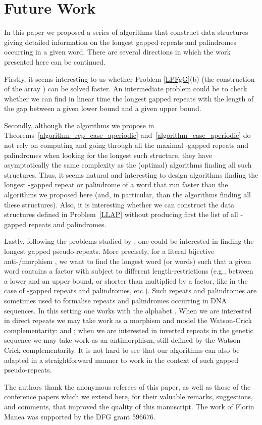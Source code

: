 \documentclass[final]{dmtcs-episciences}
\begin{document}
\section{Future Work}

In this paper we proposed a series of algorithms that construct data structures giving detailed information on the longest gapped repeats  and palindromes occurring in a given word. There are several directions in which the work presented here can be continued.

Firstly, it seems interesting to us whether Problem \ref{LPFgG}(b) (the construction of the array ) can be solved faster. An intermediate problem could be to check whether we can find in linear time the longest gapped repeats with the length of the gap between a given lower bound and a given upper bound. 

Secondly, although the algorithms we propose in Theorems~\ref{algorithm_rep_case_aperiodic} and~\ref{algorithm_case_aperiodic} do not rely on computing and going through all the maximal -gapped repeats and palindromes when looking for the longest such structure, they have asymptotically the same complexity as the (optimal) algorithms finding all such structures. Thus, it seems natural and interesting to design algorithms finding the longest -gapped repeat or palindrome of a word that run faster than the algorithms we proposed here (and, in particular, than the algorithms finding all these structures). Also, it is interesting whether we can construct the data structures defined in Problem~\ref{LLAP} without producing first the list of all -gapped repeats and palindromes. 

Lastly, following the problems studied by \cite{GMMNT13,GMN14}, one could be interested in finding the longest gapped pseudo-repeats. More precisely, for a literal bijective anti-/morphism , we want to find the longest word (or words)  such that a given word  contains a factor  with  subject to different length-restrictions (e.g., between a lower and an upper bound, or shorter than  multiplied by a factor, like in the case of -gapped repeats and palindromes, etc.). Such repeats and palindromes are sometimes used to formalise repeats and palindromes occurring in DNA sequences. In this setting one works with the alphabet . When we are interested in direct repeats we may take  work as a morphism and model the Watson-Crick complementarity:  and ;  when we are interested in inverted repeats in the genetic sequence we may take  work as an antimorphism, still defined by the Watson-Crick complementarity. It is not hard to see that our algorithms can also be adapted in a straightforward manner to work in the context of such gapped pseudo-repeats.


\acknowledgements
The authors thank the anonymous referees of this paper, as well as those of the conference papers which we extend here, for their valuable remarks, suggestions, and comments, that improved the quality of this manuscript. The work of Florin Manea was supported by the DFG grant 596676.


\nocite{*}


\label{sec:biblio}
\end{document}
